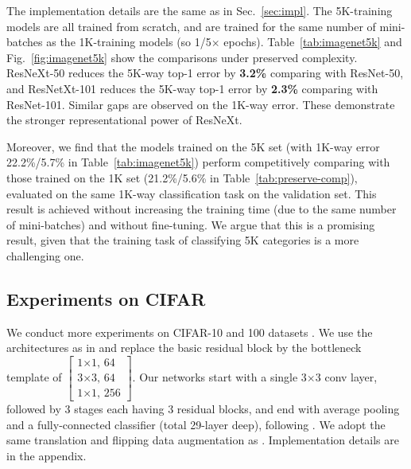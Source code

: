 \documentclass[10pt,twocolumn,letterpaper]{article}
\begin{document}
The implementation details are the same as in Sec.~\ref{sec:impl}. The 5K-training models are all trained from scratch, and are trained for the same number of mini-batches as the 1K-training models (so 1/5$\times$ epochs).
Table~\ref{tab:imagenet5k} and Fig.~\ref{fig:imagenet5k} show the comparisons under preserved complexity. ResNeXt-50 reduces the 5K-way top-1 error by \textbf{3.2\%} comparing with ResNet-50, and ResNetXt-101 reduces the 5K-way top-1 error by \textbf{2.3\%} comparing with ResNet-101.
Similar gaps are observed on the 1K-way error.
These demonstrate the stronger representational power of ResNeXt.

Moreover, we find that the models trained on the 5K set (with 1K-way error 22.2\%/5.7\% in Table~\ref{tab:imagenet5k}) perform competitively comparing with those trained on the 1K set (21.2\%/5.6\% in Table~\ref{tab:preserve-comp}), evaluated on the same 1K-way classification task on the validation set. This result is achieved without increasing the training time (due to the same number of mini-batches) and without fine-tuning. We argue that this is a promising result, given that the training task of classifying 5K categories is a more challenging one.

\subsection{Experiments on CIFAR}

\newcommand{\blockc}[2]{\fontsize{6pt}{.8em}\selectfont \(\left[\begin{array}{c}\text{1$\times$1, #2}\\[-.1em] \text{3$\times$3, #2}\\[-.1em] \text{1$\times$1, #1}\end{array}\right]\)
}

We conduct more experiments on CIFAR-10 and 100 datasets \cite{Krizhevsky2009}.
We use the architectures as in \cite{He2016} and replace the basic residual block by the bottleneck template of {\fontsize{6pt}{.8em}\selectfont \(\left[\begin{array}{c}\text{1$\times$1, 64}\\[-.1em] \text{3$\times$3, 64}\\[-.1em] \text{1$\times$1, 256}\end{array}\right]\)}.
Our networks start with a single 3$\times$3 conv layer, followed by 3 stages each having 3 residual blocks, and end with average pooling and a fully-connected classifier (total 29-layer deep), following \cite{He2016}.
We adopt the same translation and flipping data augmentation as \cite{He2016}.
Implementation details are in the appendix.
\end{document}
